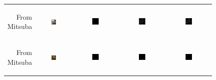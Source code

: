 \begin{figure}[t!bp]
\begin{tabular}{@{}r@{ } c@{ } c@{ } c@{ } c }
		\begin{sideways} \parbox[b]{30mm} {\small{From\\ Mitsuba}} \end{sideways} &
		\includegraphics[width=0.15\textwidth]{figs/4_results/veach-bidir/1_from_mitsuba} &
		\includegraphics[width=0.15\textwidth]{figs/4_results/veach-bidir/diff_mitsuba-pbrt.png} &
		\includegraphics[width=0.15\textwidth]{figs/4_results/veach-bidir/diff_mitsuba-lux.png} &
		\includegraphics[width=0.15\textwidth]{figs/4_results/veach-bidir/diff_pbrt-lux.png} \\
		
		\begin{sideways} \parbox[b]{20mm} {\small{From\\ Mitsuba}} \end{sideways} &
		\includegraphics[width=0.15\textwidth]{figs/4_results/cornell-box/1_from_mitsuba.png} &
		\includegraphics[width=0.15\textwidth]{figs/4_results/cornell-box/diff_mitsuba-pbrt.png} &
		\includegraphics[width=0.15\textwidth]{figs/4_results/cornell-box/diff_mitsuba-lux.png} &
		\includegraphics[width=0.15\textwidth]{figs/4_results/cornell-box/diff_pbrt-lux.png} \\
		

\end{tabular}
\end{figure}
